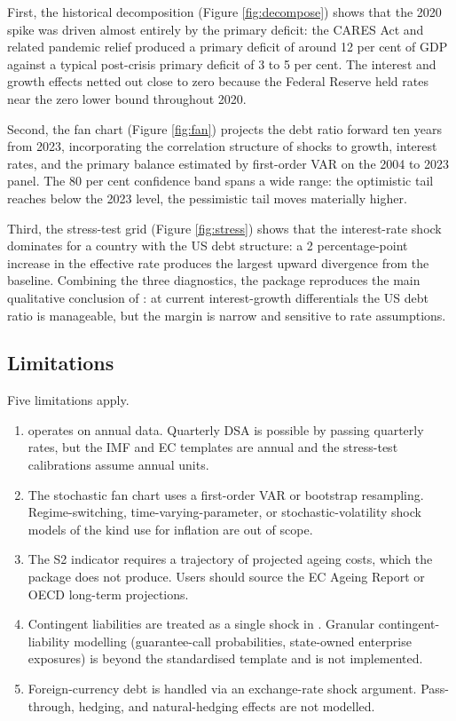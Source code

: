 First, the historical decomposition (Figure \ref{fig:decompose}) shows
that the 2020 spike was driven almost entirely by the primary deficit:
the CARES Act and related pandemic relief produced a primary deficit of
around 12 per cent of GDP against a typical post-crisis primary deficit
of 3 to 5 per cent. The interest and growth effects netted out close to
zero because the Federal Reserve held rates near the zero lower bound
throughout 2020.

Second, the fan chart (Figure \ref{fig:fan}) projects the debt ratio
forward ten years from 2023, incorporating the correlation structure of
shocks to growth, interest rates, and the primary balance estimated by
first-order VAR on the 2004 to 2023 panel. The 80 per cent confidence
band spans a wide range: the optimistic tail reaches below the 2023
level, the pessimistic tail moves materially higher.

Third, the stress-test grid (Figure \ref{fig:stress}) shows that the
interest-rate shock dominates for a country with the US debt structure:
a 2 percentage-point increase in the effective rate produces the largest
upward divergence from the baseline. Combining the three diagnostics,
the package reproduces the main qualitative conclusion of
\citet{blanchard2022fiscal}: at current interest-growth differentials
the US debt ratio is manageable, but the margin is narrow and sensitive
to rate assumptions.

\subsection{Limitations}\label{limitations}

Five limitations apply.

\begin{enumerate}
\def\labelenumi{\arabic{enumi}.}
\tightlist
\item
   operates on annual data. Quarterly DSA is possible
  by passing quarterly rates, but the IMF and EC templates are annual
  and the stress-test calibrations assume annual units.
\item
  The stochastic fan chart uses a first-order VAR or bootstrap
  resampling. Regime-switching, time-varying-parameter, or
  stochastic-volatility shock models of the kind \citet{stock2007why}
  use for inflation are out of scope.
\item
  The S2 indicator requires a trajectory of projected ageing costs,
  which the package does not produce. Users should source the EC Ageing
  Report or OECD long-term projections.
\item
  Contingent liabilities are treated as a single shock in
  . Granular contingent-liability modelling
  (guarantee-call probabilities, state-owned enterprise exposures) is
  beyond the standardised template and is not implemented.
\item
  Foreign-currency debt is handled via an exchange-rate shock argument.
  Pass-through, hedging, and natural-hedging effects are not modelled.
\end{enumerate}

